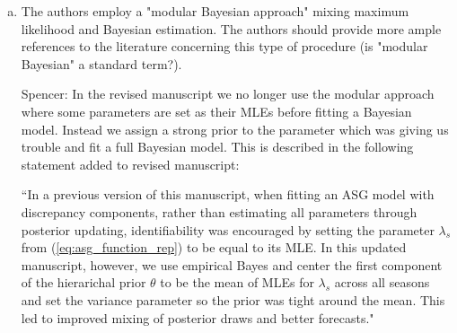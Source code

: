 \documentclass{article}
\newcommand{\spencer}[1]{{\color{blue} Spencer: #1}}
\begin{document}
\begin{enumerate}[1.]
\begin{enumerate}[a.]
% 

\item The authors employ a "modular Bayesian approach" mixing maximum likelihood and
Bayesian estimation. The authors should provide more ample references to the literature concerning
this type of procedure (is "modular Bayesian" a standard term?).

\spencer{In the revised manuscript we no longer use the modular approach
where some parameters are set as their MLEs before fitting a Bayesian 
model. Instead
we assign a strong prior to the parameter which was giving us trouble
and fit a full Bayesian model. This is
described in the following statement added to revised manuscript:

``In a previous version of this manuscript, when fitting an ASG model
with discrepancy components,
rather than estimating all parameters through posterior updating,
identifiability was encouraged by setting
the parameter $\lambda_s$ from (\ref{eq:asg_function_rep})
to be equal to its MLE. In this updated manuscript, 
however, we use empirical Bayes and center the first component of the 
hierarichal prior $\theta$ to be the mean of MLEs for $\lambda_s$ across
all seasons and set the variance parameter so the prior was tight around the
mean. This led to improved mixing of posterior draws and better forecasts."}


\end{enumerate}
\end{enumerate}
\end{document}
